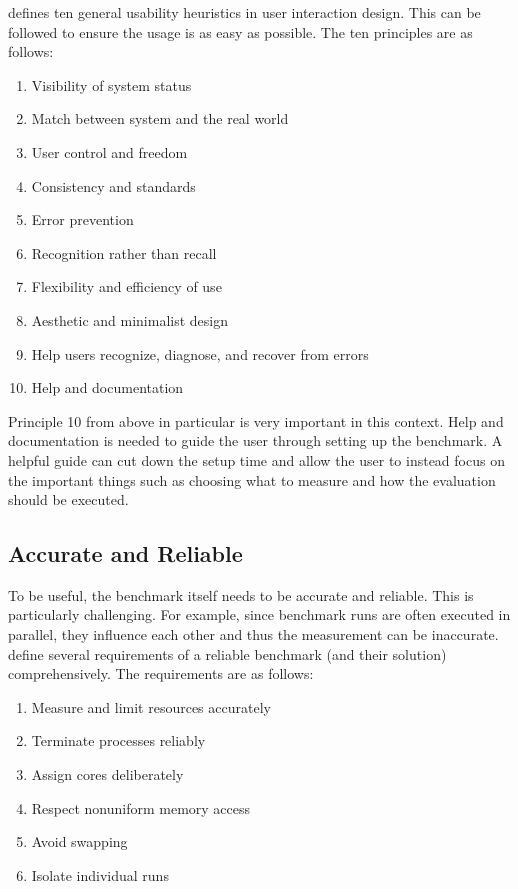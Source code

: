 \citet{nielsenTenUsabilityHeuristics2006} defines ten general usability heuristics in user interaction design.
This can be followed to ensure the usage is as easy as possible.
The ten principles are as follows:
\begin{enumerate}[noitemsep]
	\item Visibility of system status
	\item Match between system and the real world
	\item User control and freedom
	\item Consistency and standards
	\item Error prevention
	\item Recognition rather than recall
	\item Flexibility and efficiency of use
	\item Aesthetic and minimalist design
	\item Help users recognize, diagnose, and recover from errors
	\item Help and documentation
\end{enumerate}

Principle 10 from above in particular is very important in this context.
Help and documentation is needed to guide the user through setting up the benchmark.
A helpful guide can cut down the setup time and allow the user to instead focus on the important things such as choosing what to measure and how the evaluation should be executed.


\subsection{Accurate and Reliable}
To be useful, the benchmark itself needs to be accurate and reliable.
This is particularly challenging.
For example, since benchmark runs are often executed in parallel, they influence each other and thus the measurement can be inaccurate.
\citet{beyerReliableBenchmarkingRequirements2019} define several requirements of a reliable benchmark (and their solution) comprehensively.
The requirements are as follows:

\begin{enumerate}[noitemsep]
	\item Measure and limit resources accurately
	\item Terminate processes reliably
	\item Assign cores deliberately
	\item Respect nonuniform memory access
	\item Avoid swapping
	\item Isolate individual runs
\end{enumerate}

